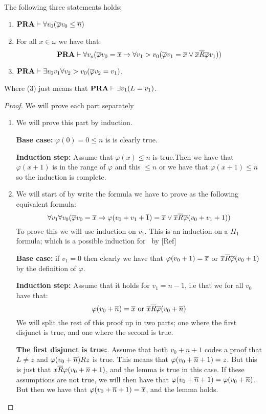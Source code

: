 \documentclass[../main.tex]{subfiles}
\begin{document}
\begin{lem}
	\label{lem:2}
	The following three statements holds:
	\begin{enumerate}
		\item $\text{\textbf{PRA}}\vdash\forall v_0(\overline \varphi v_0\leq \overline n)$
		\item For all $x\in\omega$ we have that:\ $$\text{\textbf{PRA}}\vdash\forall
			v_o(\overline
			\varphi v_0=\overline x\rightarrow\forall v_1>v_0(\overline \varphi v_1=\overline x\vee
			\overline x\overline R\overline \varphi v_1))$$
		\item $\text{\textbf{PRA}}\vdash\exists v_0v_1\forall v_2>v_0(\overline \varphi v_2=v_1)$. 
	\end{enumerate}
	Where (3) just means that $\text{\textbf{PRA}}\vdash\exists v_1(L=v_1)$.
\end{lem}
\begin{proof}

	We will prove each part separately 

	\begin{enumerate}

		\item We will prove this part by induction.

			\textbf{Base case:} $\varphi(0)=0\leq n$ is is clearly true.

			\textbf{Induction step:} Assume that $\varphi(x)\leq n$ is
			true.Then we have that $\varphi(x+1)$ is in the range
			of $\varphi$
			and this $\leq n$ or we have that $\varphi(x+1)\leq n$ so the
			induction is complete.
		\item We will start of by write the formula we have to prove as
			the following equivalent formula:
			$$\forall v_1\forall v_0(\overline{\varphi}v_0=\overline x\rightarrow
			\varphi(v_0 + v_1+\overline 1)=\overline x\vee \overline x\overline R\overline
			\varphi(v_0+v_1+1))$$
			To prove this we will use induction on $v_1$. This is
			an induction on a $\Pi_1$ formula; which is a possible
			induction for \PRA\ by [Ref] 

			\textbf{Base case:} if $v_1=0$ then clearly we have that
			$\varphi(v_0+1)=\overline x$ or $\overline x\overline R\overline
			\varphi(v_0+1)$ by the definition of $\varphi$.

			\textbf{Induction step:} Assume that it holds for
			$v_1=n-1$, i.e that we for all $v_0$ have that:
			\[\varphi(v_0+\ol n)=\ol x\ \text{or}\ \ol x\ol
			R\ol\varphi(v_0+\ol n)\]
			We will split the rest of this proof up in two parts;
			one where the first disjunct is true, and one where the
			second is true.

			\textbf{The first disjunct is true:}. Assume that both
			$v_0+n+1$ codes a proof that $L\not =z$ and
			$\varphi(v_0+\overline n) Rz$ is true. This means that
			$\varphi(v_0+\overline n+1)=z$. But this is just that $x\overline
			R\varphi(v_0+\overline n+1)$, and the lemma is true in this case.
			If these assumptions are not true, we will then have
			that $\varphi(v_0+\overline n+1)=\varphi(v_0+\overline n)$. But
			then we have that $\varphi(v_0+\overline n+1)=\overline x$, and the
			lemma holds.
			

\end{enumerate}
\end{proof}
\end{document}
